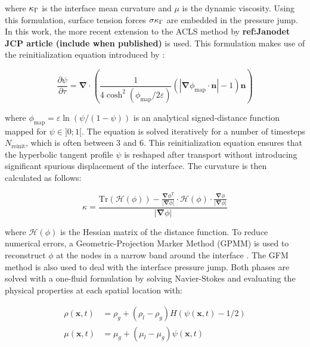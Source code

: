where $\kappa_{\scriptsize{\Gamma}}$ is the interface mean curvature and $\mu$ is the dynamic viscosity. Using this formulation, surface tension forces $\sigma\kappa_{\scriptsize{\Gamma}}$ are embedded in the pressure jump. \\

In this work, the more recent extension to the ACLS method by \textbf{ref:Janodet JCP article (include when published)} is used. This formulation makes use of the reinitialization equation introduced by :

\begin{equation}
\label{eq:acls_reinit_2017}
\frac{\partial\psi}{\partial \tau}=\boldsymbol{\nabla}\cdot\left(\frac{1}{4\cosh^2{\left(\phi_{\mathrm{map}}/2\varepsilon\right)}}\left(|\boldsymbol{\nabla}\phi_{\mathrm{map}}\cdot\textbf{n}|-1\right)\textbf{n}\right)
\end{equation}

where $\phi_{\mathrm{map}}=\varepsilon\ln\left({\psi}/({1-\psi})\right)$ is an analytical signed-distance function mapped for $\psi \in ]0;1[$. The equation is solved iteratively for a number of timesteps $N_\mathrm{reinit}$, which is often between 3 and 6. This reinitialization equation ensures that the hyperbolic tangent profile $\psi$ is reshaped after transport without introducing significant spurious displacement of the interface. The curvature is then calculated as follows:

\begin{equation}
\kappa=\frac{\mathrm{Tr}\left(\boldsymbol{\mathcal{H}}(\phi)\right)-\frac{\boldsymbol{\nabla}\phi^T}{|\boldsymbol{\nabla}\phi|}\cdot\boldsymbol{\mathcal{H}}\left(\phi\right)\cdot\frac{\boldsymbol{\nabla}\phi}{|\boldsymbol{\nabla}\phi|}}{|\boldsymbol{\nabla}\phi|}
\label{eq:curvature_Goldman}
\end{equation}

where $\mathcal{H} \left( \phi \right)$ is the Hessian matrix of the distance function. To reduce numerical errors, a Geometric-Projection Marker Method (GPMM) is used to reconstruct $\phi$ at the nodes in a narrow band around the interface . The GFM method is also used to deal with the interface pressure jump. Both phases are solved with a one-fluid formulation by solving Navier-Stokes and evaluating the physical properties at each spatial location with:

\begin{subequations}
\begin{align}
\rho(\textbf{x},t) &= \rho_g+(\rho_l-\rho_g)H(\psi(\textbf{x},t)-1/2)  \\
\mu(\textbf{x},t) &= \mu_g+(\mu_l-\mu_g)\psi(\textbf{x},t)
\end{align}
\end{subequations}

